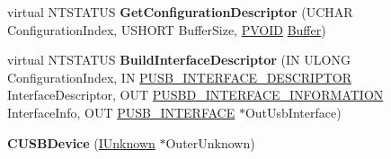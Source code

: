 \begin{DoxyCompactItemize}
virtual N\+T\+S\+T\+A\+T\+US {\bfseries Get\+Configuration\+Descriptor} (U\+C\+H\+AR Configuration\+Index, U\+S\+H\+O\+RT Buffer\+Size, \hyperlink{interfacevoid}{P\+V\+O\+ID} \hyperlink{class_buffer}{Buffer})
\item 
\mbox{\label{class_c_u_s_b_device_ae592e4287a01c0a2cc0145f003afb347}} 
virtual N\+T\+S\+T\+A\+T\+US {\bfseries Build\+Interface\+Descriptor} (IN U\+L\+O\+NG Configuration\+Index, IN \hyperlink{struct___u_s_b___i_n_t_e_r_f_a_c_e___d_e_s_c_r_i_p_t_o_r}{P\+U\+S\+B\+\_\+\+I\+N\+T\+E\+R\+F\+A\+C\+E\+\_\+\+D\+E\+S\+C\+R\+I\+P\+T\+OR} Interface\+Descriptor, O\+UT \hyperlink{struct___u_s_b_d___i_n_t_e_r_f_a_c_e___i_n_f_o_r_m_a_t_i_o_n}{P\+U\+S\+B\+D\+\_\+\+I\+N\+T\+E\+R\+F\+A\+C\+E\+\_\+\+I\+N\+F\+O\+R\+M\+A\+T\+I\+ON} Interface\+Info, O\+UT \hyperlink{struct___u_s_b___i_n_t_e_r_f_a_c_e}{P\+U\+S\+B\+\_\+\+I\+N\+T\+E\+R\+F\+A\+CE} $\ast$Out\+Usb\+Interface)
\item 
\mbox{\label{class_c_u_s_b_device_a9f36c8996aee25a161d83ec0d8c72654}} 
{\bfseries C\+U\+S\+B\+Device} (\hyperlink{interface_i_unknown}{I\+Unknown} $\ast$Outer\+Unknown)
\end{DoxyCompactItemize}
